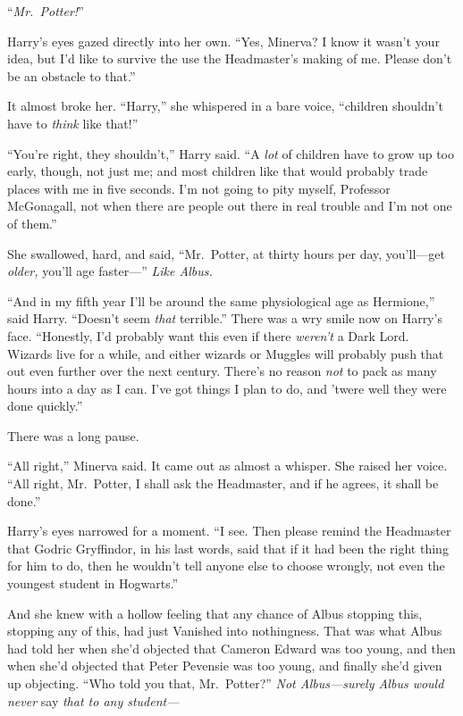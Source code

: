 “\emph{Mr.~Potter!}”

Harry’s eyes gazed directly into her own. “Yes, Minerva? I know it wasn’t your idea, but I’d like to survive the use the Headmaster’s making of me. Please don’t be an obstacle to that.”

It almost broke her. “Harry,” she whispered in a bare voice, “children shouldn’t have to \emph{think} like that!”

“You’re right, they shouldn’t,” Harry said. “A \emph{lot} of children have to grow up too early, though, not just me; and most children like that would probably trade places with me in five seconds. I’m not going to pity myself, Professor McGonagall, not when there are people out there in real trouble and I’m not one of them.”

She swallowed, hard, and said, “Mr.~Potter, at thirty hours per day, you’ll—get \emph{older,} you’ll age faster—” \emph{Like Albus.}

“And in my fifth year I’ll be around the same physiological age as Hermione,” said Harry. “Doesn’t seem \emph{that} terrible.” There was a wry smile now on Harry’s face. “Honestly, I’d probably want this even if there \emph{weren’t} a Dark Lord. Wizards live for a while, and either wizards or Muggles will probably push that out even further over the next century. There’s no reason \emph{not} to pack as many hours into a day as I can. I’ve got things I plan to do, and ’twere well they were done quickly.”

There was a long pause.

“All right,” Minerva said. It came out as almost a whisper. She raised her voice. “All right, Mr.~Potter, I shall ask the Headmaster, and if he agrees, it shall be done.”

Harry’s eyes narrowed for a moment. “I see. Then please remind the Headmaster that Godric Gryffindor, in his last words, said that if it had been the right thing for him to do, then he wouldn’t tell anyone else to choose wrongly, not even the youngest student in Hogwarts.”

And she knew with a hollow feeling that any chance of Albus stopping this, stopping any of this, had just Vanished into nothingness. That was what Albus had told her when she’d objected that Cameron Edward was too young, and then when she’d objected that Peter Pevensie was too young, and finally she’d given up objecting. “Who told you that, Mr.~Potter?” \emph{Not Albus—surely Albus would never} say\emph{ that to any student—}

